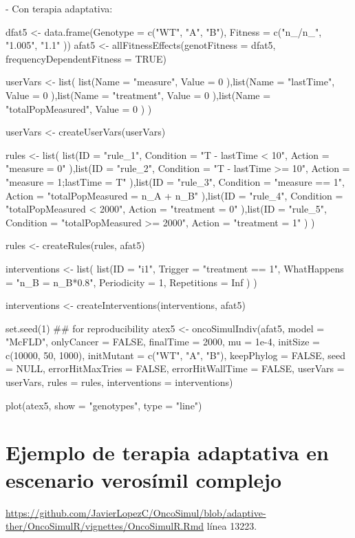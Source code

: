 - Con terapia adaptativa:
\begin{R}
	dfat5 <- data.frame(Genotype = c("WT", "A", "B"), 
	Fitness = c("n_/n_",
	"1.005",
	"1.1"
	))
	afat5 <- allFitnessEffects(genotFitness = dfat5, 
	frequencyDependentFitness = TRUE)
	
	userVars <- list(
	list(Name           = "measure",
	Value       = 0
	),list(Name           = "lastTime",
	Value       = 0
	),list(Name           = "treatment",
	Value       = 0
	),list(Name           = "totalPopMeasured",
	Value       = 0
	)
	)
	
	userVars <- createUserVars(userVars)
	
	rules <- list(
	list(ID = "rule_1",
	Condition = "T - lastTime < 10",
	Action = "measure = 0"
	),list(ID = "rule_2",
	Condition = "T - lastTime >= 10",
	Action = "measure = 1;lastTime = T"
	),list(ID = "rule_3",
	Condition = "measure == 1",
	Action = "totalPopMeasured = n_A + n_B"
	),list(ID = "rule_4",
	Condition = "totalPopMeasured < 2000",
	Action = "treatment = 0"
	),list(ID = "rule_5",
	Condition = "totalPopMeasured >= 2000",
	Action = "treatment = 1"
	)
	)
	
	rules <- createRules(rules, afat5)
	
	interventions <- list(
	list(ID           = "i1",
	Trigger       = "treatment == 1",
	WhatHappens   = "n_B = n_B*0.8",
	Periodicity   = 1,
	Repetitions   = Inf
	)
	)
	
	interventions <- createInterventions(interventions, afat5)
	
	set.seed(1) ## for reproducibility
	atex5 <- oncoSimulIndiv(afat5,
	model = "McFLD", 
	onlyCancer = FALSE, 
	finalTime = 2000,
	mu = 1e-4,
	initSize = c(10000, 50, 1000), 
	initMutant = c("WT", "A", "B"),
	keepPhylog = FALSE,
	seed = NULL, 
	errorHitMaxTries = FALSE, 
	errorHitWallTime = FALSE,
	userVars = userVars,
	rules = rules,
	interventions = interventions)
	
	plot(atex5, show = "genotypes", type = "line")
\end{R}
	
\section{Ejemplo de terapia adaptativa en escenario verosímil complejo}\label{A.4}

\url{https://github.com/JavierLopezC/OncoSimul/blob/adaptive-ther/OncoSimulR/vignettes/OncoSimulR.Rmd} línea 13223.

